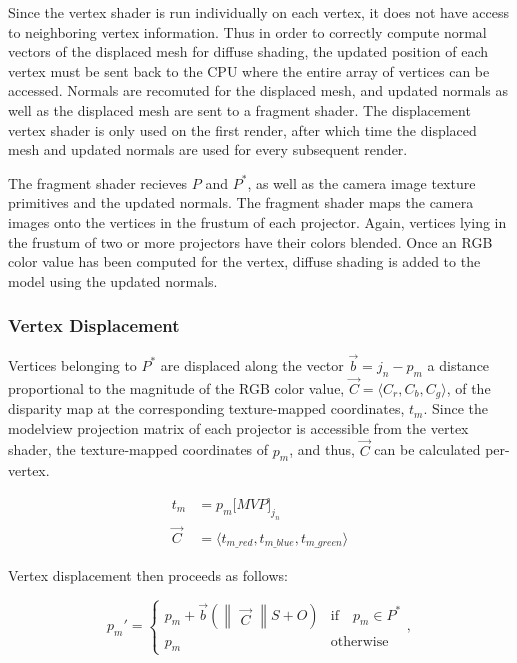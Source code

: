 \documentclass[twocolumn]{article}
\begin{document}
Since the vertex shader is run individually on each vertex, it does not have access to neighboring vertex information. Thus in order to correctly compute normal vectors of the displaced mesh for diffuse shading, the updated position of each vertex must be sent back to the CPU where the entire array of vertices can be accessed. Normals are recomuted for the displaced mesh, and updated normals as well as the displaced mesh are sent to a fragment shader. The displacement vertex shader is only used on the first render, after which time the displaced mesh and updated normals are used for every subsequent render.

The fragment shader recieves $P$ and $P^{*}$, as well as the camera image texture primitives and the updated normals. The fragment shader maps the camera images onto the vertices in the frustum of each projector. Again, vertices lying in the frustum of two or more projectors have their colors blended. Once an RGB color value has been computed for the vertex, diffuse shading is added to the model using the updated normals.

\subsubsection{Vertex Displacement}

Vertices belonging to $P^{*}$ are displaced along the vector $\vec{b} = j_{n} - p_{m}$ a distance proportional to the magnitude of the RGB color value, $\vec{C} = \langle C_{r}, C_{b}, C_{g} \rangle$, of the disparity map at the corresponding texture-mapped coordinates, $t_m$. Since the modelview projection matrix of each projector is accessible from the vertex shader, the texture-mapped coordinates of $p_m$, and thus, $\vec{C}$ can be calculated per-vertex.

\begin{align}
t_{m} &= p_{m}\lbrack MVP \rbrack _{j_{n}} \\
\vec{C} &= \langle t_{m\_red}, t_{m\_blue}, t_{m\_green} \rangle
\end{align}

Vertex displacement then proceeds as follows:

\begin{equation}
p_{m}' = \left \{ 
\begin{array}{ll}
p_{m} + \vec{b} (\begin{Vmatrix}\vec{C}\end{Vmatrix} S + O) & \text{if} \quad p_{m} \in P^{*}\\
p_{m} & \text{otherwise}
\end{array},\right.
\label{eq:displace}
\end{equation}
\end{document}

